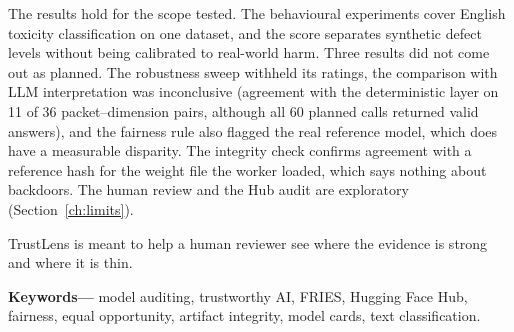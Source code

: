 The results hold for the scope tested. The behavioural experiments cover English toxicity classification on one dataset, and the score separates synthetic defect levels without being calibrated to real-world harm. Three results did not come out as planned. The robustness sweep withheld its ratings, the comparison with LLM interpretation was inconclusive (agreement with the deterministic layer on 11 of 36 packet--dimension pairs, although all 60 planned calls returned valid answers), and the fairness rule also flagged the real reference model, which does have a measurable disparity. The integrity check confirms agreement with a reference hash for the weight file the worker loaded, which says nothing about backdoors. The human review and the Hub audit are exploratory (Section~\ref{ch:limits}).

TrustLens is meant to help a human reviewer see where the evidence is strong and where it is thin.

\vspace{6pt}\noindent\textbf{Keywords---} model auditing, trustworthy AI, FRIES, Hugging Face Hub, fairness, equal opportunity, artifact integrity, model cards, text classification.

\newpage
{}
\setcounter{tocdepth}{2}
\tableofcontents
\newpage
\makeatletter\let\ps@plain\tlplain\makeatother
{}\pagestyle{plain}
\renewcommand{\listfigurename}{List of Figures}
\renewcommand{\listtablename}{List of Tables}
\listoffigures
\newpage
\listoftables
\newpage
{}
